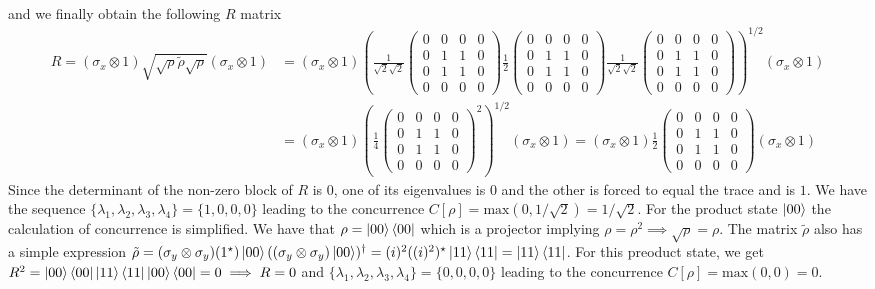 \documentclass[10pt, a4paper]{article}
\begin{document}
{\begin{enumerate}
\begin{align*}
  \end{align*}
  and we finally obtain the following $R$ matrix
  \begin{align*}
    R = (\sigma_x\otimes 1) \sqrt{\sqrt{\rho} \tilde{\rho} \sqrt{\rho}} (\sigma_x\otimes 1)  &= (\sigma_x\otimes 1) \left(\frac{1}{\sqrt{2}\sqrt{2}}\begin{pmatrix}
      0 & 0 & 0 & 0\\
      0 & 1 & 1 & 0\\
      0 & 1 & 1 & 0\\
      0 & 0 & 0 & 0
    \end{pmatrix} 
    \frac{1}{2}
     \begin{pmatrix}
      0 & 0 & 0 & 0\\
      0 & 1 & 1 & 0\\
      0 & 1 & 1 & 0\\
      0 & 0 & 0 & 0
    \end{pmatrix}
    \frac{1}{\sqrt{2}\sqrt{2}}\begin{pmatrix}
      0 & 0 & 0 & 0\\
      0 & 1 & 1 & 0\\
      0 & 1 & 1 & 0\\
      0 & 0 & 0 & 0
    \end{pmatrix} \right)^{1/2} (\sigma_x\otimes 1)\\
    &= 
    (\sigma_x\otimes 1) \left(\frac{1}{4} 
    \begin{pmatrix}
      0 & 0 & 0 & 0\\
      0 & 1 & 1 & 0\\
      0 & 1 & 1 & 0\\
      0 & 0 & 0 & 0
    \end{pmatrix}^2 \right)^{1/2} (\sigma_x\otimes 1)  = 
    (\sigma_x\otimes 1)\frac{1}{2} 
    \begin{pmatrix}
      0 & 0 & 0 & 0\\
      0 & 1 & 1 & 0\\
      0 & 1 & 1 & 0\\
      0 & 0 & 0 & 0
    \end{pmatrix} (\sigma_x\otimes 1)
  \end{align*}
  Since the determinant of the non-zero block of $R$ is $0$, one of its eigenvalues is $0$ and the other is forced to equal the trace and is $1$. We have the sequence $\{\lambda_1, \lambda_2, \lambda_3, \lambda_4\} = \{1, 0, 0, 0\}$ leading to the concurrence $C[\rho] = \text{max}(0, 1/\sqrt{2}) = 1/\sqrt{2}$. For the product state $\ket{00}$ the calculation of concurrence is simplified. We have that $\rho = \ket{00}\bra{00}$ which is a projector implying $\rho = \rho^2 \implies \sqrt{\rho} = \rho$. The matrix $\tilde{\rho}$ also has a simple expression $\tilde{\rho} = (\sigma_y \otimes \sigma_y)(1^\star)\ket{00} ((\sigma_y \otimes \sigma_y) \ket{00})^{\dagger} = (i)^2 ((i)^2)^\star \ket{11}\bra{11} = \ket{11}\bra{11}$. For this preoduct state, we get $R^2 = \ket{00}\bra{00}\ket{11}\bra{11}\ket{00}\bra{00} = 0 \implies R = 0$ and $\{\lambda_1, \lambda_2, \lambda_3, \lambda_4\} = \{0, 0, 0, 0\}$ leading to the concurrence $C[\rho] = \text{max}(0, 0) = 0$.

\end{enumerate}}
\end{document}
